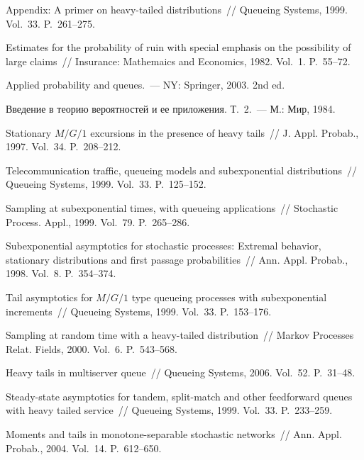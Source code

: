 \begin{multicols}{2}
{{\begin{thebibliography}{99}
Appendix: A primer on heavy-tailed distributions~//
Queueing Systems, 1999. Vol.~33. P.~261--275.

Estimates for the probability of ruin with special emphasis on the possibility of
large claims~// Insurance: Mathemaics and Economics, 1982. Vol.~1. P.~55--72.

Applied probability and queues.~--- NY: Springer, 2003. 2nd ed.

Введение в теорию вероятностей и ее приложения. Т.~2.~--- М.: Мир, 1984.

Stationary $M/G/1$ excursions in the presence of heavy tails~// J. Appl. Probab., 1997. Vol.~34. P.~208--212.

Telecommunication traffic, queueing models and subexponential distributions~//
Queueing Systems, 1999. Vol.~33. P.~125--152.

Sampling at subexponential times, with queueing applications~// Stochastic
Process. Appl., 1999. Vol.~79. P.~265--286.

Subexponential asymptotics for stochastic processes: Extremal
behavior, stationary distributions and first passage probabilities~//
 Ann. Appl. Probab., 1998. Vol.~8. P.~354--374.

Tail asymptotics for $M/G/1$ type queueing processes with subexponential
increments~//
Queueing Systems, 1999. Vol.~33. P.~153--176.

Sampling at random time with a heavy-tailed distribution~// Markov Processes Relat. Fields,
2000. Vol.~6. P.~543--568.

Heavy tails in multiserver queue~// Queueing Systems, 2006. Vol.~52. P.~31--48.

Steady-state asymptotics for tandem, split-match and other feedforward queues with heavy tailed
service~// Queueing Systems, 1999. Vol.~33. P.~233--259.

Moments and tails in monotone-separable stochastic networks~//
 Ann. Appl. Probab., 2004. Vol.~14. P.~612--650.


\end{thebibliography}}}
\end{multicols}
